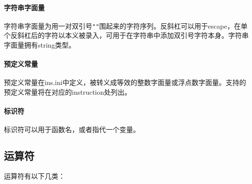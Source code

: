 \documentclass[UTF8]{ctexart}
\begin{document}
\paragraph{字符串字面量} 字符串字面量为用一对双引号\verb|""|围起来的字符序列。反斜杠可以用于escape，在单个反斜杠后的字符以本义被录入，可用于在字符串中添加双引号字符本身。字符串字面量拥有string类型。

\paragraph{预定义常量} 预定义常量在ins.ini中定义，被转义成等效的整数字面量或浮点数字面量。支持的预定义常量将在对应的instruction处列出。

\paragraph{标识符} 标识符可以用于函数名，或者指代一个变量。%

\subsection{运算符}

运算符有以下几类：
\end{document}
